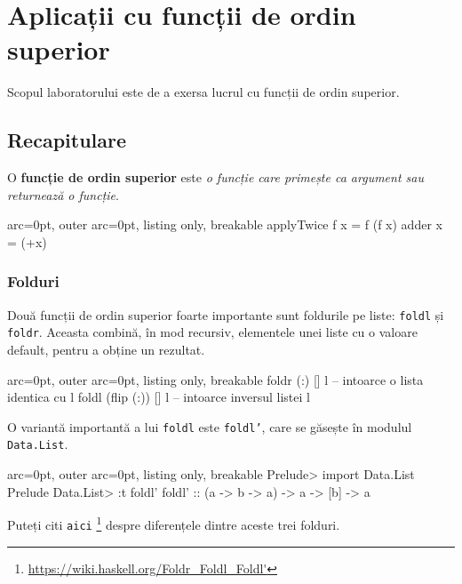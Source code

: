 \section*{ Aplicații cu funcții de ordin superior }

Scopul laboratorului este de a exersa lucrul cu funcții de ordin superior.

\subsection*{ Recapitulare }

O \textbf{funcție de ordin superior} este \textit{o funcție care primește ca argument sau returnează o funcție}.


\begin{tcblisting}{ arc=0pt, outer arc=0pt, listing only, breakable}
applyTwice f x = f (f x)
adder x = (+x)

\end{tcblisting}


\subsubsection*{ Folduri }
Două funcții de ordin superior foarte importante sunt foldurile pe liste: \texttt{foldl} și \texttt{foldr}. Aceasta combină, în mod recursiv, elementele unei liste cu o valoare default, pentru a obține un rezultat.



\begin{tcblisting}{ arc=0pt, outer arc=0pt, listing only, breakable}
foldr (:) [] l         -- intoarce o lista identica cu l
foldl (flip (:)) [] l  -- intoarce inversul listei l

\end{tcblisting}


\begin{tcolorbox}[colback=blue!10, colframe=blue!20]
O variantă importantă a lui \texttt{foldl} este \texttt{foldl'}, care se găsește în modulul \texttt{Data.List}.


\begin{tcblisting}{ arc=0pt, outer arc=0pt, listing only, breakable}
Prelude> import Data.List
Prelude Data.List> :t foldl'
foldl' :: (a -> b -> a) -> a -> [b] -> a

\end{tcblisting}


Puteți citi \texttt{aici} \footnote{\url{https://wiki.haskell.org/Foldr\_Foldl\_Foldl'}} despre diferențele dintre aceste trei folduri.
\end{tcolorbox}

